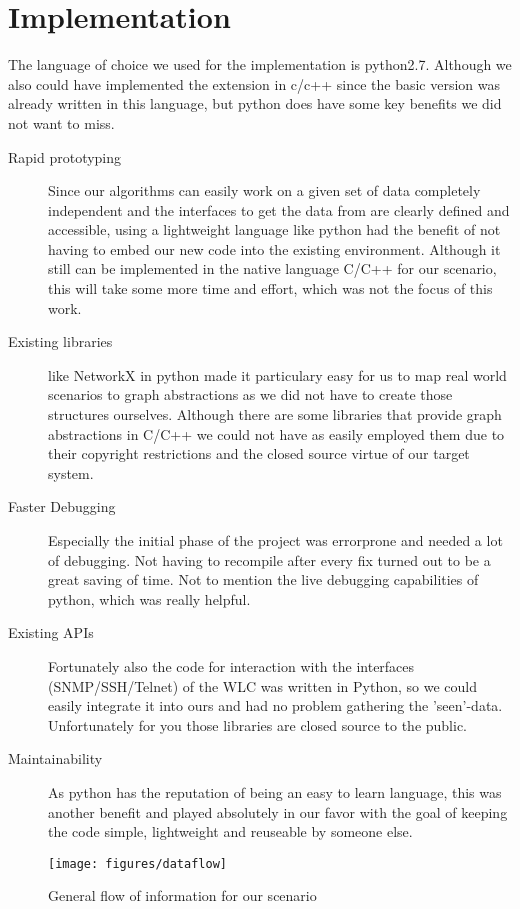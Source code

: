 \chapter{Implementation}
  The language of choice we used for the implementation is python2.7. Although we also could have implemented the extension in c/c++ since the basic version
  was already written in this language, but python does have some key benefits we did not want to miss.
  \begin{description}
    \item [Rapid prototyping]
    Since our algorithms can easily work on a given set of data completely independent and the interfaces to get the data from are clearly defined and accessible,
    using a lightweight language like python had the benefit of not having to embed our new code into the existing environment. Although it still can be implemented 
    in the native language C/C++ for our scenario, this will take some more time and effort, which was not the focus of this work.
    \item[Existing libraries]
    like NetworkX in python made it particulary easy for us to map real world scenarios to graph abstractions as we did not have to create those structures ourselves.
    Although there are some libraries that provide graph abstractions in C/C++ we could not have as easily employed them due to their copyright restrictions and 
    the closed source virtue of our target system.
    \item[Faster Debugging]
    Especially the initial phase of the project was errorprone and needed a lot of debugging. Not having to recompile after every fix turned out to be
    a great saving of time. Not to mention the live debugging capabilities of python, which was really helpful.
    \item[Existing APIs]
    Fortunately also the code for interaction with the interfaces (SNMP/SSH/Telnet) of the WLC was written in Python, so we could easily 
    integrate it into ours and had no problem gathering the 'seen'-data. Unfortunately for you those libraries are closed source to the public.
    \item[Maintainability]
    As python has the reputation of being an easy to learn language, this was another benefit and played absolutely in our favor with the goal of
    keeping the code simple, lightweight and reuseable by someone else.
  \end{description}
  \begin{figure}[t]
    \centering
    \texttt{[image: figures/dataflow]}
    \caption{General flow of information for our scenario}
    \label{fig:dataflow}
  \end{figure}

